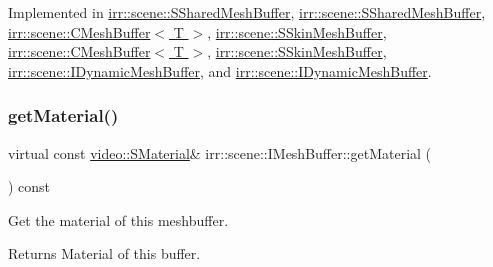 Implemented in \hyperlink{structirr_1_1scene_1_1SSharedMeshBuffer_ac1dcea2247c8f63adc4a5935ce39bcbc}{irr\+::scene\+::\+S\+Shared\+Mesh\+Buffer}, \hyperlink{structirr_1_1scene_1_1SSharedMeshBuffer_ac1dcea2247c8f63adc4a5935ce39bcbc}{irr\+::scene\+::\+S\+Shared\+Mesh\+Buffer}, \hyperlink{classirr_1_1scene_1_1CMeshBuffer_af69e8356b4525a3fee1ddbf188d81e8a}{irr\+::scene\+::\+C\+Mesh\+Buffer$<$ T $>$}, \hyperlink{structirr_1_1scene_1_1SSkinMeshBuffer_a5e4a6cc69dac5ac75d43d8e89a23da2b}{irr\+::scene\+::\+S\+Skin\+Mesh\+Buffer}, \hyperlink{classirr_1_1scene_1_1CMeshBuffer_af69e8356b4525a3fee1ddbf188d81e8a}{irr\+::scene\+::\+C\+Mesh\+Buffer$<$ T $>$}, \hyperlink{structirr_1_1scene_1_1SSkinMeshBuffer_a5e4a6cc69dac5ac75d43d8e89a23da2b}{irr\+::scene\+::\+S\+Skin\+Mesh\+Buffer}, \hyperlink{classirr_1_1scene_1_1IDynamicMeshBuffer_a6ed3a5ce948ebef063b7ea9e07974eb7}{irr\+::scene\+::\+I\+Dynamic\+Mesh\+Buffer}, and \hyperlink{classirr_1_1scene_1_1IDynamicMeshBuffer_a6ed3a5ce948ebef063b7ea9e07974eb7}{irr\+::scene\+::\+I\+Dynamic\+Mesh\+Buffer}.

\mbox{\label{classirr_1_1scene_1_1IMeshBuffer_a341c1da2fd0cd556a15aab06d07dbbaa}} 
\subsubsection{\texorpdfstring{get\+Material()}{getMaterial()}\hspace{0.1cm}{\footnotesize\ttfamily [3/4]}}
{\footnotesize\ttfamily virtual const \hyperlink{classirr_1_1video_1_1SMaterial}{video\+::\+S\+Material}\& irr\+::scene\+::\+I\+Mesh\+Buffer\+::get\+Material (\begin{DoxyParamCaption}{ }\end{DoxyParamCaption}) const\hspace{0.3cm}{\ttfamily [pure virtual]}}



Get the material of this meshbuffer. 

\begin{DoxyReturn}{Returns}
Material of this buffer. 
\end{DoxyReturn}


